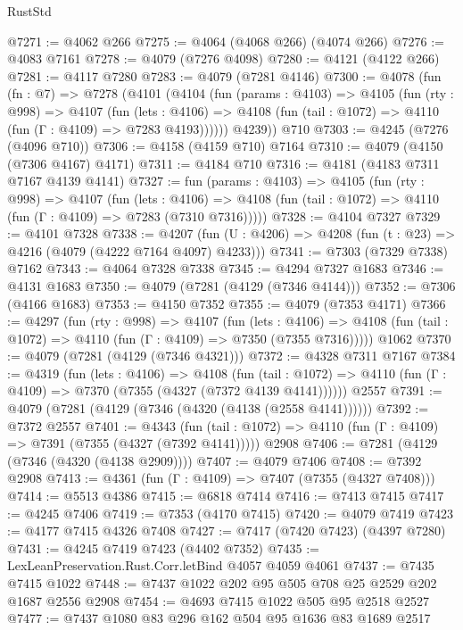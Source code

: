 \begin{lexlean}{RustStd}
\begin{coremodule}
{\begin{coremodule}
{{{{{{{{{{{{{{@7271 := @4062 @266
@7275 := @4064 (@4068 @266) (@4074 @266)
@7276 := @4083 @7161
@7278 := @4079 (@7276 @4098)
@7280 := @4121 (@4122 @266)
@7281 := @4117 @7280
@7283 := @4079 (@7281 @4146)
@7300 := @4078
    (fun (fn : @7) =>
    @7278
      (@4101
        (@4104
          (fun (params : @4103) =>
          @4105
            (fun (rty : @998) =>
            @4107
              (fun (lets : @4106) =>
              @4108 (fun (tail : @1072) => @4110 (fun (Γ : @4109) => @7283 @4193))))))
        @4239))
    @710
@7303 := @4245 (@7276 (@4096 @710))
@7306 := @4158 (@4159 @710) @7164
@7310 := @4079 (@4150 (@7306 @4167) @4171)
@7311 := @4184 @710
@7316 := @4181 (@4183 @7311 @7167 @4139 @4141)
@7327 := fun (params : @4103) =>
  @4105
    (fun (rty : @998) =>
    @4107
      (fun (lets : @4106) =>
      @4108 (fun (tail : @1072) => @4110 (fun (Γ : @4109) => @7283 (@7310 @7316)))))
@7328 := @4104 @7327
@7329 := @4101 @7328
@7338 := @4207 (fun (U : @4206) => @4208 (fun (t : @23) => @4216 (@4079 (@4222 @7164 @4097) @4233)))
@7341 := @7303 (@7329 @7338) @7162
@7343 := @4064 @7328 @7338
@7345 := @4294 @7327 @1683
@7346 := @4131 @1683
@7350 := @4079 (@7281 (@4129 (@7346 @4144)))
@7352 := @7306 (@4166 @1683)
@7353 := @4150 @7352
@7355 := @4079 (@7353 @4171)
@7366 := @4297
    (fun (rty : @998) =>
    @4107
      (fun (lets : @4106) =>
      @4108 (fun (tail : @1072) => @4110 (fun (Γ : @4109) => @7350 (@7355 @7316)))))
    @1062
@7370 := @4079 (@7281 (@4129 (@7346 @4321)))
@7372 := @4328 @7311 @7167
@7384 := @4319
    (fun (lets : @4106) =>
    @4108
      (fun (tail : @1072) => @4110 (fun (Γ : @4109) => @7370 (@7355 (@4327 (@7372 @4139 @4141))))))
    @2557
@7391 := @4079 (@7281 (@4129 (@7346 (@4320 (@4138 (@2558 @4141))))))
@7392 := @7372 @2557
@7401 := @4343
    (fun (tail : @1072) => @4110 (fun (Γ : @4109) => @7391 (@7355 (@4327 (@7392 @4141)))))
    @2908
@7406 := @7281 (@4129 (@7346 (@4320 (@4138 @2909))))
@7407 := @4079 @7406
@7408 := @7392 @2908
@7413 := @4361 (fun (Γ : @4109) => @7407 (@7355 (@4327 @7408)))
@7414 := @5513 @4386
@7415 := @6818 @7414
@7416 := @7413 @7415
@7417 := @4245 @7406
@7419 := @7353 (@4170 @7415)
@7420 := @4079 @7419
@7423 := @4177 @7415 @4326 @7408
@7427 := @7417 (@7420 @7423) (@4397 @7280)
@7431 := @4245 @7419 @7423 (@4402 @7352)
@7435 := LexLeanPreservation.Rust.Corr.letBind @4057 @4059 @4061
@7437 := @7435 @7415 @1022
@7448 := @7437 @1022 @202 @95 @505 @708 @25 @2529 @202 @1687 @2556 @2908
@7454 := @4693 @7415 @1022 @505 @95 @2518 @2527
@7477 := @7437
    @1080
    @83
    @296
    @162
    @504
    @95
    @1636
    @83
    @1689
    @2517
}}}}}}}}}}}}}}
\end{coremodule}}
\end{coremodule}
\end{lexlean}
